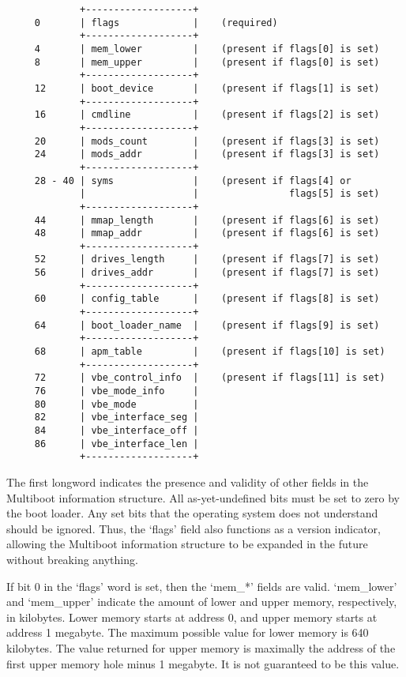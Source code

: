\begin{verbatim}
             +-------------------+
     0       | flags             |    (required)
             +-------------------+
     4       | mem_lower         |    (present if flags[0] is set)
     8       | mem_upper         |    (present if flags[0] is set)
             +-------------------+
     12      | boot_device       |    (present if flags[1] is set)
             +-------------------+
     16      | cmdline           |    (present if flags[2] is set)
             +-------------------+
     20      | mods_count        |    (present if flags[3] is set)
     24      | mods_addr         |    (present if flags[3] is set)
             +-------------------+
     28 - 40 | syms              |    (present if flags[4] or
             |                   |                flags[5] is set)
             +-------------------+
     44      | mmap_length       |    (present if flags[6] is set)
     48      | mmap_addr         |    (present if flags[6] is set)
             +-------------------+
     52      | drives_length     |    (present if flags[7] is set)
     56      | drives_addr       |    (present if flags[7] is set)
             +-------------------+
     60      | config_table      |    (present if flags[8] is set)
             +-------------------+
     64      | boot_loader_name  |    (present if flags[9] is set)
             +-------------------+
     68      | apm_table         |    (present if flags[10] is set)
             +-------------------+
     72      | vbe_control_info  |    (present if flags[11] is set)
     76      | vbe_mode_info     |
     80      | vbe_mode          |
     82      | vbe_interface_seg |
     84      | vbe_interface_off |
     86      | vbe_interface_len |
             +-------------------+
\end{verbatim}

The first longword indicates the presence and validity of other fields in the
Multiboot information structure. All as-yet-undefined bits must be set to zero
by the boot loader. Any set bits that the operating system does not understand
should be ignored. Thus, the ‘flags’ field also functions as a version
indicator, allowing the Multiboot information structure to be expanded in the
future without breaking anything.

If bit 0 in the ‘flags’ word is set, then the ‘mem\_*’ fields are valid.
‘mem\_lower’ and ‘mem\_upper’ indicate the amount of lower and upper memory,
respectively, in kilobytes. Lower memory starts at address 0, and upper memory
starts at address 1 megabyte. The maximum possible value for lower memory is 640
kilobytes. The value returned for upper memory is maximally the address of the
first upper memory hole minus 1 megabyte. It is not guaranteed to be this value.

